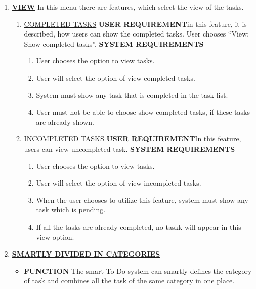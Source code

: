 \documentclass[12pt, a4paper]{report}
\begin{document}
\begin{enumerate}
	\item \textbf{\underline{VIEW}} \newline In this menu there are features, which select the view of the tasks. \newline  \begin{enumerate} \item \underline{COMPLETED TASKS} \newline \newline \textbf{USER REQUIREMENT}\newline  \newline in this feature, it is described, how users can show the completed tasks.  User chooses “View: Show completed tasks”. \newline \newline \textbf{SYSTEM REQUIREMENTS} 
	\begin{enumerate}
	\item User chooses the option to view tasks.
	\item User will select the option of view completed tasks.
	\item System must show any task that is completed in the task list.
	\item User must not be able to choose show completed tasks, if these tasks are already shown. 
	\end{enumerate}

	\item \underline{INCOMPLETED TASKS} \newline \newline \textbf{USER REQUIREMENT}\newline  \newline In this feature, users can view uncompleted task.  \newline \newline \textbf{SYSTEM REQUIREMENTS} 
	\begin{enumerate}
	\item User chooses the option to view tasks.
	\item User will select the option of view incompleted tasks.
	\item When the user chooses to utilize this feature, system must show any task which is pending.
	\item If all the tasks are already completed, no taskk will appear in this view option.
	\end{enumerate}
	\end{enumerate}

	\item \textbf{\underline{SMARTLY DIVIDED IN CATEGORIES}} \newline \begin{itemize} \item \textbf{FUNCTION} \newline The smart To Do system can smartly defines the category of task and combines all the task of the same category in one place.


\end{itemize}
\end{enumerate}
\end{document}
